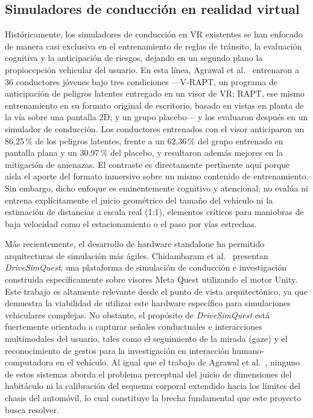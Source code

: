 \documentclass[conference]{IEEEtran}
\begin{document}
\subsection{Simuladores de conducción en realidad virtual}

Históricamente, los simuladores de conducción en VR existentes se han enfocado de manera casi exclusiva en el entrenamiento de reglas de tránsito, la evaluación cognitiva y la anticipación de riesgos, dejando en un segundo plano la propiocepción vehicular del usuario. En esta línea, Agrawal et al.~\cite{agrawal2018} entrenaron a 36 conductores jóvenes bajo tres condiciones —V-RAPT, un programa de anticipación de peligros latentes entregado en un visor de VR; RAPT, ese mismo entrenamiento en su formato original de escritorio, basado en vistas en planta de la vía sobre una pantalla 2D; y un grupo placebo— y los evaluaron después en un simulador de conducción. Los conductores entrenados con el visor anticiparon un 86,25\,\% de los peligros latentes, frente a un 62,36\,\% del grupo entrenado en pantalla plana y un 30,97\,\% del placebo, y resultaron además mejores en la mitigación de amenazas. El contraste es directamente pertinente aquí porque aísla el aporte del formato inmersivo sobre un mismo contenido de entrenamiento. Sin embargo, dicho enfoque es eminentemente cognitivo y atencional; no evalúa ni entrena explícitamente el juicio geométrico del tamaño del vehículo ni la estimación de distancias a escala real (1:1), elementos críticos para maniobras de baja velocidad como el estacionamiento o el paso por vías estrechas.

Más recientemente, el desarrollo de hardware standalone ha permitido arquitecturas de simulación más ágiles. Chidambaram et al.~\cite{chidambaram2025} presentan \textit{DriveSimQuest}, una plataforma de simulación de conducción e investigación construida específicamente sobre visores Meta Quest utilizando el motor Unity. Este trabajo es altamente relevante desde el punto de vista arquitectónico, ya que demuestra la viabilidad de utilizar este hardware específico para simulaciones vehiculares complejas. No obstante, el propósito de \textit{DriveSimQuest} está fuertemente orientado a capturar señales conductuales e interacciones multimodales del usuario, tales como el seguimiento de la mirada (gaze) y el reconocimiento de gestos para la investigación en interacción humano-computadora en el vehículo. Al igual que el trabajo de Agrawal et al.~\cite{agrawal2018}, ninguno de estos sistemas aborda el problema perceptual del juicio de dimensiones del habitáculo ni la calibración del esquema corporal extendido hacia los límites del chasis del automóvil, lo cual constituye la brecha fundamental que este proyecto busca resolver.
\end{document}
